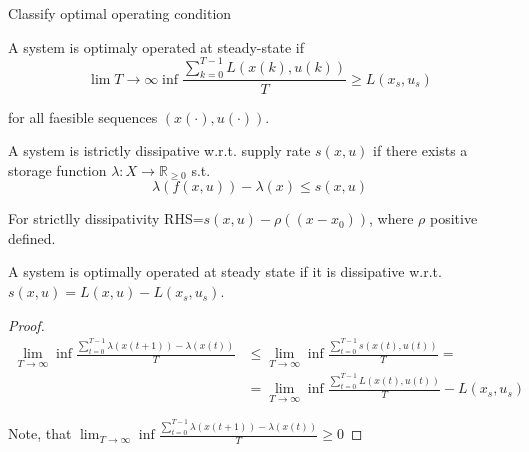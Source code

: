 Classify optimal operating condition

\begin{Definition}
 A system is optimaly operated at steady-state if
 $$\lim{T\rightarrow\infty}\inf\frac{\sum_{k=0}^{T-1}L(x(k),u(k))}{T} \ge L(x_s,u_s)$$

 for all faesible sequences $(x(\cdot), u(\cdot))$.
\end{Definition}

\begin{Definition}
 A system is istrictly dissipative w.r.t. supply rate $s(x,u)$ if there exists a storage 
 function $\lambda:X\rightarrow\mathbb{R}_{\ge 0}$ s.t.
 $$\lambda(f(x,u))-\lambda(x)\le s(x,u)$$

 For strictlly dissipativity RHS=$s(x,u)-\rho((x-x_0))$, where $\rho$ positive defined.
\end{Definition}

\begin{Theorem}
 A system is optimally operated at steady state if it is dissipative w.r.t.
 $s(x,u)=L(x,u)-L(x_s,u_s)$.
 \begin{proof}
  \begin{equation}
   \begin{split}
    \lim_{T\rightarrow\infty}\inf\frac{\sum_{t=0}^{T-1}\lambda(x(t+1))-\lambda(x(t))}{T} &\le
           \lim_{T\rightarrow\infty}\inf\frac{\sum_{t=0}^{T-1}s(x(t),u(t))}{T}= \\
           &=\lim_{T\rightarrow\infty}\inf\frac{\sum_{t=0}^{T-1}L(x(t),u(t))}{T}-L(x_s,u_s)
   \end{split}
  \end{equation}

  Note, that $\lim_{T\rightarrow\infty}\inf\frac{\sum_{t=0}^{T-1}\lambda(x(t+1))-\lambda(x(t))}{T} \ge 0$
 \end{proof}
\end{Theorem}


